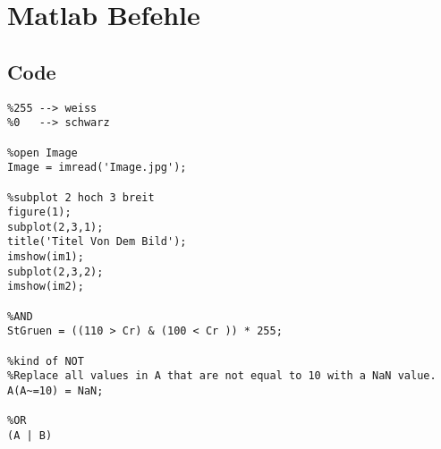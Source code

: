 \section{Matlab Befehle}
\subsection{Code}
\begin{lstlisting}
%255 --> weiss 
%0 	 --> schwarz

%open Image
Image = imread('Image.jpg'); 

%subplot 2 hoch 3 breit
figure(1);
subplot(2,3,1);
title('Titel Von Dem Bild'); 
imshow(im1);
subplot(2,3,2);
imshow(im2);

%AND
StGruen = ((110 > Cr) & (100 < Cr )) * 255;

%kind of NOT
%Replace all values in A that are not equal to 10 with a NaN value.
A(A~=10) = NaN;

%OR
(A | B)
\end{lstlisting}


